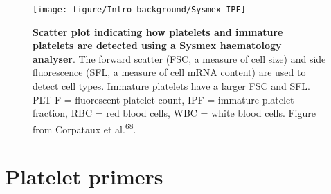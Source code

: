 \documentclass[11pt,twoside]{bristolthesis}
\begin{document}
\begin{figure}
\texttt{[image: figure/Intro\_background/Sysmex\_IPF]} \caption[Scatter plot indicating how platelets are immature platelets are detected using a Sysmex haematology analyser]{\textbf{Scatter plot indicating how platelets and immature platelets are detected using a Sysmex haematology analyser}. The forward scatter (FSC, a measure of cell size) and side fluorescence (SFL, a measure of cell mRNA content) are used to detect cell types. Immature platelets have a larger FSC and SFL. PLT-F = fluorescent platelet count, IPF = immature platelet fraction, RBC = red blood cells, WBC = white blood cells. Figure from Corpataux et al.\textsuperscript{\protect\hyperlink{ref-Corpataux2020}{68}}.}\label{fig:sysmex-ipf}
\end{figure}
\hypertarget{platelet-primers}{%
\section{Platelet primers}\label{platelet-primers}}
\end{document}
